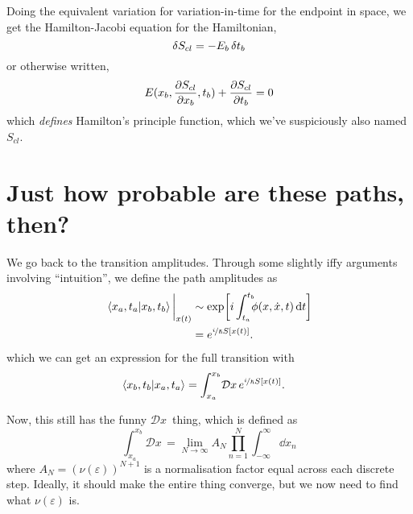 \documentclass[]{scrreprt}
\renewcommand\hbar\hslash
\newcommand{\DD}[1]{\ensuremath{\mathcal{D} #1\,}}
\begin{document}
Doing the equivalent variation for variation-in-time for the endpoint in space, we get the Hamilton-Jacobi equation for the Hamiltonian, \[\variation{S_{cl} = - E_b \variation{t_b}}\] or otherwise written,
\[E(x_b, \pdv{S_{cl}}{x_b}, t_b) + \pdv{S_{cl}}{t_b} = 0\] which \emph{defines} Hamilton's principle function, which we've suspiciously also named \(S_{cl}\).

\section{Just how probable are these paths, then?}
We go back to the transition amplitudes.
Through some slightly iffy arguments involving ``intuition'', we define the path amplitudes as
\begin{align*}
  \eval{\braket{x_a, t_a}{x_b, t_b}}_{x(t)} &\sim \exp[i\int_{t_a}^{t_b} \!\!\!\phi(x, \dot x, t) \dd{t}]\\
  &= e^{\nicefrac{i}{\hbar} S[x(t)]}.
\end{align*}
which we can get an expression for the full transition with
\begin{align*}
  \braket{x_b, t_b}{x_a, t_a} &= \int_{x_a}^{x_b}\!\DD{x} e^{\nicefrac{i}{\hbar} S[x(t)]}.
\end{align*}

Now, this still has the funny \(\DD{x}\) thing, which is defined as
\[\int_{x_a}^{x_b}\!\DD{x} = \lim_{N\to \infty} A_N \prod_{n=1}^N \int_{-\infty}^{\infty} \dd{x_{n}} \] where \(A_N = (\nu(\varepsilon))^{N+1}\) is a normalisation factor equal across each discrete step.
Ideally, it should make the entire thing converge, but we now need to find what \(\nu(\varepsilon)\) is.
\end{document}
